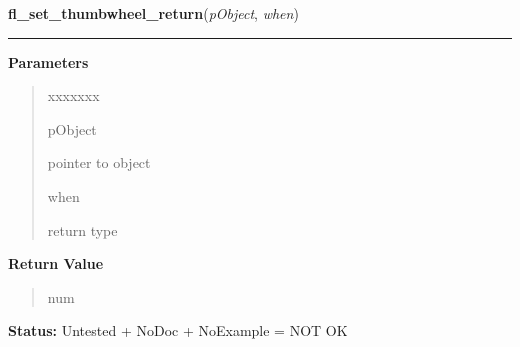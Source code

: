 \hspace{.8\funcindent}\begin{boxedminipage}{\funcwidth}

    \raggedright \textbf{fl\_set\_thumbwheel\_return}(\textit{pObject}, \textit{when})

    \vspace{-1.5ex}

    \rule{\textwidth}{0.5\fboxrule}
\setlength{\parskip}{2ex}
\setlength{\parskip}{1ex}
      \textbf{Parameters}
      \vspace{-1ex}

      \begin{quote}
        \begin{Ventry}{xxxxxxx}

          \item[pObject]

          pointer to object

          \item[when]

          return type

        \end{Ventry}

      \end{quote}

      \textbf{Return Value}
    \vspace{-1ex}

      \begin{quote}
      num

      \end{quote}

\textbf{Status:} Untested + NoDoc + NoExample = NOT OK



    \end{boxedminipage}

    \label{xformslib:library:fl_set_thumbwheel_crossover}

    \vspace{0.5ex}

